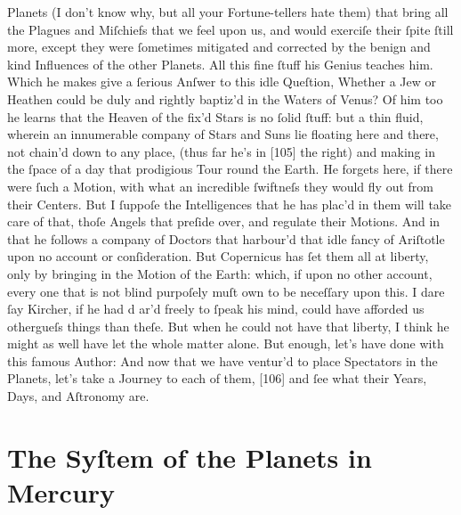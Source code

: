 \documentclass[letterpaper]{book}
\begin{document}
Planets (I don't know why, but all your Fortune-tellers hate them) that
bring all the Plagues and Miſchiefs that we feel upon us, and would exerciſe
their ſpite ſtill more, except they were ſometimes mitigated and corrected
by the benign and kind Influences of the other Planets. All this fine ſtuff
his Genius teaches him. Which he makes give a ſerious Anſwer to this idle
Queſtion, Whether a Jew or Heathen could be duly and rightly baptiz'd in the
Waters of Venus? Of him too he learns that the Heaven of the fix'd Stars is
no ſolid ſtuff: but a thin fluid, wherein an innumerable company of Stars
and Suns lie floating here and there, not chain'd down to any place, (thus
far he's in [105] the right) and making in the ſpace of a day that
prodigious Tour round the Earth. He forgets here, if there were ſuch a
Motion, with what an incredible ſwiftneſs they would fly out from their
Centers. But I ſuppoſe the Intelligences that he has plac'd in them will
take care of that, thoſe Angels that preſide over, and regulate their
Motions. And in that he follows a company of Doctors that harbour'd that
idle fancy of Ariſtotle upon no account or conſideration. But Copernicus has
ſet them all at liberty, only by bringing in the Motion of the Earth: which,
if upon no other account, every one that is not blind purpoſely muſt own to
be neceſſary upon this. I dare ſay Kircher, if he had d ar'd freely to ſpeak
his mind, could have afforded us othergueſs things than theſe. But when he
could not have that liberty, I think he might as well have let the whole
matter alone. But enough, let's have done with this famous Author: And now
that we have ventur'd to place Spectators in the Planets, let's take a
Journey to each of them, [106] and ſee what their Years, Days, and Aſtronomy
are.


\section{The Syſtem of the Planets in Mercury}
\end{document}
